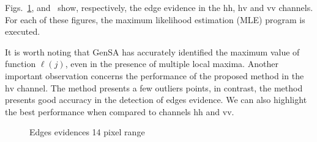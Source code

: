 \documentclass[journal]{IEEEtran}
\begin{document}
Figs.~\ref{evidencias_hh_hv_vv},  and~ show, respectively, the edge evidence in the $\text{hh}$, $\text{hv}$ and $\text{vv}$ channels. For each of these figures, the maximum likelihood estimation (MLE) program is executed.

It is worth noting that GenSA has accurately identified the maximum value of function $\ell(j)$, even in the presence of multiple local maxima. Another important observation concerns the performance of the proposed method in the $\text{hv}$ channel. The method presents a few outliers points, in contrast, the method presents good accuracy in the detection of edges evidence. We can also highlight the best performance when compared to channels $\text{hh}$ and $\text{vv}$. 


   \begin{figure}[hbt]
	\centering
     \caption{Edges evidences 14 pixel range}
     \label{evidencias_hh_hv_vv} 
   \end{figure}
\end{document}
